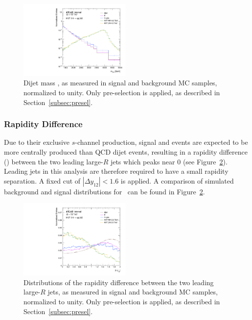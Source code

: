 \begin{figure}[htbp!]
\begin{center}
    \includegraphics[width=0.49\textwidth]{Ch5_VHqqbb/figures/VHqqbb_SimpleSigBkgMC_mVH.pdf}
\end{center}
\caption{Dijet mass \mvh, as measured in signal and background MC samples, normalized to unity.
Only pre-selection is applied, as described in Section~\ref{subsec:presel}.}
\label{fig:simple_mc_mVH}
\end{figure}

\subsubsection{Rapidity Difference}
Due to their exclusive $s$-channel production, signal \wpwh and \zpzh events are expected to be more centrally produced than QCD dijet events, resulting in a rapidity difference () between the two leading large-$R$ jets which peaks near 0 (see Figure~\ref{fig:simple_mc_rapidity}).
Leading jets in this analysis are therefore required to have a small rapidity separation. A fixed cut of $|\Delta{y}_{12}|<1.6$ is applied.
A comparison of simulated background and signal distributions for \ can be found in Figure~\ref{fig:simple_mc_rapidity}.

\begin{figure}[htbp!]
\begin{center}
    \includegraphics[width=0.49\textwidth]{VHqqbb_SimpleSigBkgMC_dyVH.pdf}
\end{center}
\caption{Distributions of the rapidity difference between the two leading \pt large-$R$ jets, as measured in signal and background MC samples, normalized to unity. Only pre-selection is applied, as described in Section~\ref{subsec:presel}. }
\label{fig:simple_mc_rapidity}
\end{figure}

